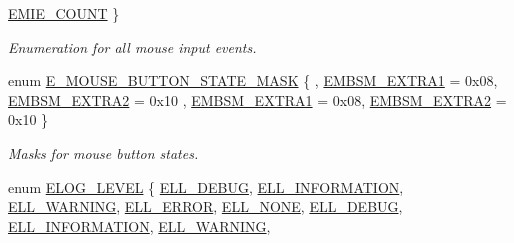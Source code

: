 \begin{DoxyCompactItemize}
\hyperlink{namespaceirr_a2dbf2a247aa17a9eeefbbf36ebd5739fa6daf05317a5903aa5c6726f5dee514ba}{E\+M\+I\+E\+\_\+\+C\+O\+U\+NT}
 \}\begin{DoxyCompactList}\small\item\em Enumeration for all mouse input events. \end{DoxyCompactList}
\item 
enum \hyperlink{namespaceirr_a7057ec6fd3bba7cbbab3593c9e405a86}{E\+\_\+\+M\+O\+U\+S\+E\+\_\+\+B\+U\+T\+T\+O\+N\+\_\+\+S\+T\+A\+T\+E\+\_\+\+M\+A\+SK} \{ , \hyperlink{namespaceirr_a7057ec6fd3bba7cbbab3593c9e405a86a00f1fa58dfbfb318a01d0753d88c0519}{E\+M\+B\+S\+M\+\_\+\+E\+X\+T\+R\+A1} = 0x08, 
\hyperlink{namespaceirr_a7057ec6fd3bba7cbbab3593c9e405a86ad108523dca5d7c537c3e1eb6b78625d3}{E\+M\+B\+S\+M\+\_\+\+E\+X\+T\+R\+A2} = 0x10
, \hyperlink{namespaceirr_a7057ec6fd3bba7cbbab3593c9e405a86a00f1fa58dfbfb318a01d0753d88c0519}{E\+M\+B\+S\+M\+\_\+\+E\+X\+T\+R\+A1} = 0x08, 
\hyperlink{namespaceirr_a7057ec6fd3bba7cbbab3593c9e405a86ad108523dca5d7c537c3e1eb6b78625d3}{E\+M\+B\+S\+M\+\_\+\+E\+X\+T\+R\+A2} = 0x10
 \}\begin{DoxyCompactList}\small\item\em Masks for mouse button states. \end{DoxyCompactList}
\item 
enum \hyperlink{namespaceirr_aa2d1cac68606a25ed24cfffccfa30a92}{E\+L\+O\+G\+\_\+\+L\+E\+V\+EL} \{ \newline
\hyperlink{namespaceirr_aa2d1cac68606a25ed24cfffccfa30a92acb213ad3a563100198dbd7609da56151}{E\+L\+L\+\_\+\+D\+E\+B\+UG}, 
\hyperlink{namespaceirr_aa2d1cac68606a25ed24cfffccfa30a92aaed3e0f449ad8851a1bb501d4df1c0e7}{E\+L\+L\+\_\+\+I\+N\+F\+O\+R\+M\+A\+T\+I\+ON}, 
\hyperlink{namespaceirr_aa2d1cac68606a25ed24cfffccfa30a92a0f67af3d2f419bf35ca3616c4a704ff5}{E\+L\+L\+\_\+\+W\+A\+R\+N\+I\+NG}, 
\hyperlink{namespaceirr_aa2d1cac68606a25ed24cfffccfa30a92a702f1169109f7c4e2d5551a542fb333c}{E\+L\+L\+\_\+\+E\+R\+R\+OR}, 
\newline
\hyperlink{namespaceirr_aa2d1cac68606a25ed24cfffccfa30a92a1756c34c5b4a66210560fc5ade78450a}{E\+L\+L\+\_\+\+N\+O\+NE}, 
\hyperlink{namespaceirr_aa2d1cac68606a25ed24cfffccfa30a92acb213ad3a563100198dbd7609da56151}{E\+L\+L\+\_\+\+D\+E\+B\+UG}, 
\hyperlink{namespaceirr_aa2d1cac68606a25ed24cfffccfa30a92aaed3e0f449ad8851a1bb501d4df1c0e7}{E\+L\+L\+\_\+\+I\+N\+F\+O\+R\+M\+A\+T\+I\+ON}, 
\hyperlink{namespaceirr_aa2d1cac68606a25ed24cfffccfa30a92a0f67af3d2f419bf35ca3616c4a704ff5}{E\+L\+L\+\_\+\+W\+A\+R\+N\+I\+NG}, 
\newline

\end{DoxyCompactItemize}
